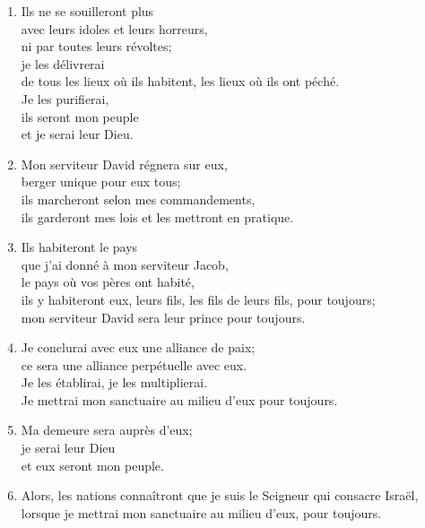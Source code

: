 \begin{enumerate}[leftmargin=\psleftmargin, labelsep = \pslabelsep, label={\arabic*}, font=\color{\pscolor}\small\textsuperscript, parsep=0em, itemsep=0em, topsep=0em ]
    \item Ils ne se souilleront plus \\ avec leurs idoles et leurs horreurs, \\ ni par toutes leurs révoltes; \\ je les délivrerai \\ de tous les lieux où ils habitent, les lieux où ils ont péché. \\ Je les purifierai, \\ ils seront mon peuple \\ et je serai leur Dieu.
    \item Mon serviteur David régnera sur eux, \\ berger unique pour eux tous; \\ ils marcheront selon mes commandements, \\ ils garderont mes lois et les mettront en pratique.
    \item Ils habiteront le pays \\ que j’ai donné à mon serviteur Jacob, \\ le pays où vos pères ont habité, \\ ils y habiteront eux, leurs fils, les fils de leurs fils, pour toujours; \\ mon serviteur David sera leur prince pour toujours.
    \item Je conclurai avec eux une alliance de paix; \\ ce sera une alliance perpétuelle avec eux. \\ Je les établirai, je les multiplierai. \\ Je mettrai mon sanctuaire au milieu d’eux pour toujours.
    \item Ma demeure sera auprès d’eux; \\ je serai leur Dieu \\ et eux seront mon peuple.
    \item Alors, les nations connaîtront que je suis le Seigneur qui consacre Israël, \\ lorsque je mettrai mon sanctuaire au milieu d’eux, pour toujours.
\end{enumerate}
